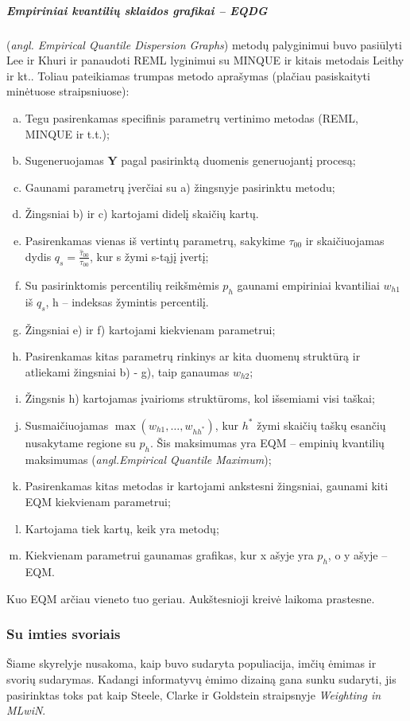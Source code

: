 \documentclass[12pt,a4paper]{article}
\begin{document}
\subparagraph{Empiriniai kvantilių sklaidos grafikai -- EQDG}(\textit{angl. Empirical Quantile Dispersion Graphs}) metodų palyginimui buvo pasiūlyti Lee ir Khuri\cite{eqdg1} ir panaudoti REML lyginimui su MINQUE ir kitais metodais Leithy ir kt.\cite{MMINQUE}. Toliau pateikiamas trumpas metodo aprašymas (plačiau pasiskaityti minėtuose straipsniuose):
\begin{enumerate}[a)] 
\item Tegu pasirenkamas specifinis parametrų vertinimo metodas (REML, MINQUE ir t.t.);
\item Sugeneruojamas $\mathbf{Y}$ pagal pasirinktą duomenis generuojantį procesą;
\item Gaunami parametrų įverčiai su a) žingsnyje pasirinktu metodu;
\item Žingsniai b) ir c) kartojami didelį skaičių kartų.
\item Pasirenkamas vienas iš vertintų parametrų, sakykime $\tau_{00}$ ir skaičiuojamas dydis $q_s=\frac{\hat{\tau}_{00}}{\tau_{00}}$, kur s žymi s-tąjį įvertį;
\item Su pasirinktomis percentilių reikšmėmis $p_h$ gaunami empiriniai kvantiliai $w_{h1}$ iš $q_s$, h -- indeksas žymintis percentilį.
\item Žingsniai e) ir f) kartojami kiekvienam parametrui;
\item Pasirenkamas kitas parametrų rinkinys ar kita duomenų struktūrą ir atliekami žingsniai b) - g), taip ganaumas $w_{h2}$;
\item Žingsnis h) kartojamas įvairioms struktūroms, kol išsemiami visi taškai;
\item Susmaičiuojamas $\max (w_{h1},\dots,w_{hh^*})$, kur $h^*$ žymi skaičių taškų esančių nusakytame regione su $p_h$. Šis maksimumas yra EQM -- empinių kvantilių maksimumas (\textit{angl.Empirical Quantile Maximum});
\item Pasirenkamas kitas metodas ir kartojami ankstesni žingsniai, gaunami kiti EQM kiekvienam parametrui;
\item Kartojama tiek kartų, keik yra metodų;
\item Kiekvienam parametrui gaunamas grafikas, kur x ašyje yra $p_h$, o y ašyje -- EQM.
\end{enumerate}
\indent Kuo EQM arčiau vieneto tuo geriau. Aukštesnioji kreivė laikoma prastesne.

\subsubsection{Su imties svoriais}\label{subsubsec:susvoriais}
\indent Šiame skyrelyje nusakoma, kaip buvo sudaryta populiacija, imčių ėmimas ir svorių sudarymas. Kadangi informatyvų ėmimo dizainą gana sunku sudaryti, jis pasirinktas toks pat kaip Steele, Clarke ir Goldstein straipsnyje \textit{Weighting in MLwiN}\cite{mlwin}. 
\end{document}

